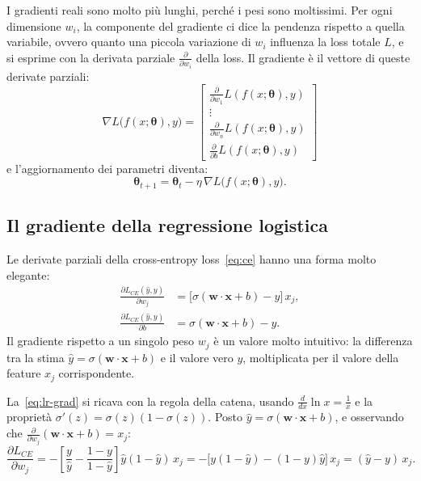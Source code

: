 I gradienti reali sono molto più lunghi, perché i pesi sono moltissimi. Per ogni dimensione $w_i$, la componente del gradiente ci dice la pendenza rispetto a quella variabile, ovvero quanto una piccola variazione di $w_i$ influenza la loss totale $L$, e si esprime con la derivata parziale $\frac{\partial}{\partial w_i}$ della loss. Il gradiente è il vettore di queste derivate parziali:
\begin{equation}
\nabla L\big(f(x; \boldsymbol{\theta}), y\big) = \begin{bmatrix} \frac{\partial}{\partial w_1} L(f(x; \boldsymbol{\theta}), y) \\ \vdots \\ \frac{\partial}{\partial w_n} L(f(x; \boldsymbol{\theta}), y) \\ \frac{\partial}{\partial b} L(f(x; \boldsymbol{\theta}), y) \end{bmatrix}
\end{equation}
e l'aggiornamento dei parametri diventa:
\begin{equation}
\boldsymbol{\theta}_{t+1} = \boldsymbol{\theta}_t - \eta\, \nabla L\big(f(x; \boldsymbol{\theta}), y\big).
\end{equation}

\subsection{Il gradiente della regressione logistica}
Le derivate parziali della cross-entropy loss~\eqref{eq:ce} hanno una forma molto elegante:
\begin{equation}\label{eq:lr-grad}
\begin{aligned}
\frac{\partial L_{CE}(\hat{y}, y)}{\partial w_j} &= \big[\sigma(\mathbf{w} \cdot \mathbf{x} + b) - y\big]\, x_j, \\
\frac{\partial L_{CE}(\hat{y}, y)}{\partial b} &= \sigma(\mathbf{w} \cdot \mathbf{x} + b) - y.
\end{aligned}
\end{equation}
Il gradiente rispetto a un singolo peso $w_j$ è un valore molto intuitivo: la differenza tra la stima $\hat{y} = \sigma(\mathbf{w} \cdot \mathbf{x} + b)$ e il valore vero $y$, moltiplicata per il valore della feature $x_j$ corrispondente.

\begin{osservazione}
La~\eqref{eq:lr-grad} si ricava con la regola della catena, usando $\frac{d}{dx}\ln x = \frac{1}{x}$ e la proprietà $\sigma'(z) = \sigma(z)(1 - \sigma(z))$. Posto $\hat{y} = \sigma(\mathbf{w} \cdot \mathbf{x} + b)$, e osservando che $\frac{\partial}{\partial w_j}(\mathbf{w} \cdot \mathbf{x} + b) = x_j$:
\[
\frac{\partial L_{CE}}{\partial w_j} = -\left[\frac{y}{\hat{y}} - \frac{1 - y}{1 - \hat{y}}\right] \hat{y}(1 - \hat{y})\, x_j = -\big[y(1 - \hat{y}) - (1 - y)\hat{y}\big]\, x_j = (\hat{y} - y)\, x_j.
\]
\end{osservazione}

